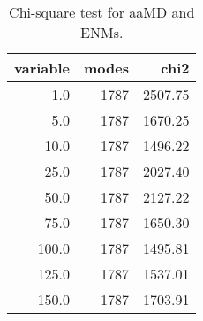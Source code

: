 \begin{table}[center]
\centering
\caption{Chi-square test for aaMD and ENMs.}
\label{tab:chi2}
\begin{tabular}{rrr}
\toprule
 variable &  modes &    chi2 \\
\midrule
      1.0 &   1787 & 2507.75 \\
      5.0 &   1787 & 1670.25 \\
     10.0 &   1787 & 1496.22 \\
     25.0 &   1787 & 2027.40 \\
     50.0 &   1787 & 2127.22 \\
     75.0 &   1787 & 1650.30 \\
    100.0 &   1787 & 1495.81 \\
    125.0 &   1787 & 1537.01 \\
    150.0 &   1787 & 1703.91 \\
\bottomrule
\end{tabular}
\end{table}
